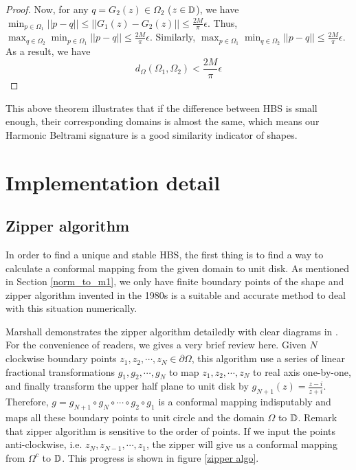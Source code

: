 \documentclass[review,onefignum,onetabnum]{siamonline190516}
\begin{document}
\begin{proof}
    Now, for any $q = G_2(z) \in \Omega_2$ ($z\in \mathbb{D}$), we have $\min_{p\in \Omega_1} ||p-q|| \leq ||G_1(z) - G_2(z)||\leq \frac{2M}{\pi}\epsilon$. Thus, $\max_{q\in \Omega_2}\min_{p\in \Omega_1} ||p-q|| \leq \frac{2M}{\pi}\epsilon$. Similarly, $\max_{p\in \Omega_1}\min_{q\in \Omega_2} ||p-q|| \leq \frac{2M}{\pi}\epsilon$. As a result, we have 
    \[
    d_\Omega(\Omega_1,\Omega_2)<\frac{2M}{\pi}\epsilon
    \]
    \end{proof}
    
    This above theorem illustrates that if the difference between HBS is small enough, their corresponding domains is almost the same, which means our Harmonic Beltrami signature is a good similarity indicator of shapes.

\section{Implementation detail}\label{implementation}
\subsection{Zipper algorithm}
    In order to find a unique and stable HBS, the first thing is to find a way to calculate a conformal mapping from the given domain to unit disk. As mentioned in Section \ref{norm_to_m1}, we only have finite boundary points of the shape and zipper algorithm invented in the 1980s is a suitable and accurate method to deal with this situation numerically. 

    Marshall \etal demonstrates the zipper algorithm detailedly with clear diagrams in \cite{marshall2007convergence}. For the convenience of readers, we gives a very brief review here. Given $N$ clockwise boundary points $z_1, z_2, \cdots, z_N \in \partial \Omega$, this algorithm use a series of linear fractional transformations $g_1, g_2, \cdots, g_N$ to map $z_1, z_2,\cdots, z_N$ to real axis one-by-one, and finally transform the upper half plane to unit disk by $g_{N+1}(z) = \frac{z-i}{z+i}$. Therefore, $g = g_{N+1} \circ g_N \circ \cdots \circ g_2 \circ g_1$ is a conformal mapping indisputably and maps all these boundary points to unit circle and the domain $\Omega$ to $\mathbb{D}$. Remark that zipper algorithm is sensitive to the order of points. If we input the points anti-clockwise, i.e. $z_N, z_{N-1}, \cdots, z_1$, the zipper will give us a conformal mapping from $\Omega^c$ to $\mathbb{D}$. This progress is shown in figure \ref{zipper algo}.
\end{document}
